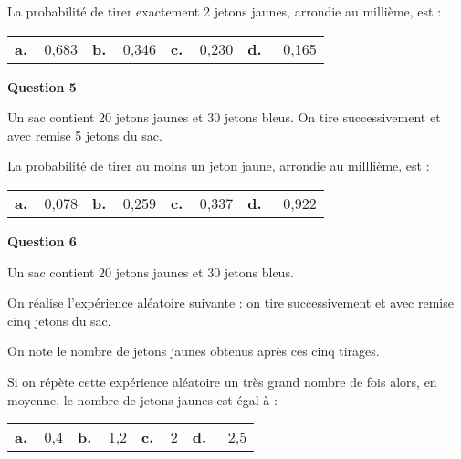 \documentclass[10pt]{article}
\begin{document}
La probabilité de tirer exactement 2 jetons jaunes, arrondie au millième, est :

\begin{center}
\begin{tabularx}{\linewidth}{*{4}{X}}
\textbf{a.~~}0,683&\textbf{b.~~}0,346 &\textbf{c.~~}0,230&\textbf{d.~~} 0,165
\end{tabularx}
\end{center}

\medskip

\textbf{Question 5}

\medskip

Un sac contient 20 jetons jaunes et 30 jetons bleus. On tire successivement et avec remise 5 jetons du sac.

La probabilité de tirer au moins un jeton jaune, arrondie au milllième, est :

\begin{center}
\begin{tabularx}{\linewidth}{*{4}{X}}
\textbf{a.~~}0,078&\textbf{b.~~}0,259 &\textbf{c.~~}0,337&\textbf{d.~~} 0,922
\end{tabularx}
\end{center}

\medskip

\textbf{Question 6}

\medskip

Un sac contient $20$ jetons jaunes et $30$ jetons bleus.

On réalise l'expérience aléatoire suivante : on tire successivement et avec remise cinq jetons du sac. 

On note le nombre de jetons jaunes obtenus après ces cinq tirages. 

Si on répète cette expérience aléatoire un très grand nombre de fois alors, en moyenne, le nombre de jetons jaunes est égal à :

\begin{center}
\begin{tabularx}{\linewidth}{*{4}{X}}
\textbf{a.~~}0,4&\textbf{b.~~}1,2 &\textbf{c.~~}2&\textbf{d.~~} 2,5
\end{tabularx}
\end{center}
\end{document}
